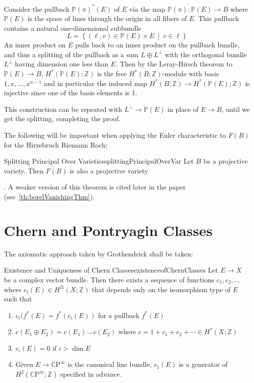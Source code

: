 \documentclass{ut-thesis}
\newenvironment{Proof}[1][]
  {\begin{ProofTcb}[#1]}
  {\end{ProofTcb}}
\newcommand{\Z}{{\mathbb{Z}}}
\renewcommand{\P}{{\mathbb{P}}}
\newcommand{\CP}{{\mathbb{C}\mathrm{P}}}
\newcommand{\set}[2]{\left\{#1 \ \middle|\ #2\right\}}
\begin{document}
\begin{Proof}
	Consider the pullback $\P(\pi)^*(E)$ of $E$ via the map $\P(\pi):\P(E) \to B$ where $\P(E)$ is the space of
	lines through the origin in all fibers of $E$. This pullback contains a natural one-dimensional subbundle
	\[
		L = \set{(\ell,v) \in \P(E) \times E}{v \in \ell}
	\]
	An inner product on $E$ pulls back to an inner product on the pullback bundle, and thus a splitting of
	the pullback as a sum $L \oplus L^\perp$ with the orthogonal bundle $L^\perp$ having dimension one less
	than $E$. Then by the Leray-Hirsch theorem to $\P(E) \to B$, $H^*(\P(E);\Z)$
	is the free $H^*(B;\Z)$-module with basis $1,x,\ldots,x^{n-1}$ and in particular the induced map
	$H^*(B;\Z) \to H^*(\P(E);\Z)$ is injective since one of the basis elements is 1.

	This construction can be repeated with $L^\perp \to \P(E)$ in place of $E \to B$, until we get the
	splitting, completing the proof.
\end{Proof}

The following will be important when applying the Euler characteristic to $F(B)$ for the Hirzebruch Riemann
Roch:

\begin{thm}{Splitting Principal Over Varieties}{splittingPrincipalOverVar}
  Let $B$ be a projective variety. Then $F(B)$ is also a projective variety
\end{thm}

\begin{Proof}
  \cite{HodgeTheory2014}. A weaker version of this theorem is cited later in the paper
  (see~\cref{th:borelVanishingThm}).
\end{Proof}

\section{Chern and Pontryagin Classes}

The axiomatic approach taken by Grothendeick shall be taken:

\begin{thm}{Existence and Uniqueness of Chern Classes}{existenceofChernClasses}
	Let $E \to X$ be a complex vector bundle. Then there exists a sequence of functions $c_1, c_2, ...$ where
	$c_i(E) \in H^{2i}(X; \Z)$ that depends only on the isomorphism type of $E$ such that
	\begin{enumerate}
		\item $c_i(f^*(E) = f^*(c_i(E))$ for a pullback $f^*(E)$
		\item $c(E_1\oplus E_2) = c(E_1)\smile c(E_2)$ where $c = 1 + c_1 + c_2 + \cdots \in H^*(X;\Z)$
		\item $c_i(E) = 0$ if $i > \dim E$
		\item Given $E \to \CP^\infty$ is the canonical line bundle, $c_1(E)$ is a generator of
			$H^2(\CP^\infty; \Z)$ specified in advance.
	\end{enumerate}
\end{thm}
\end{document}
